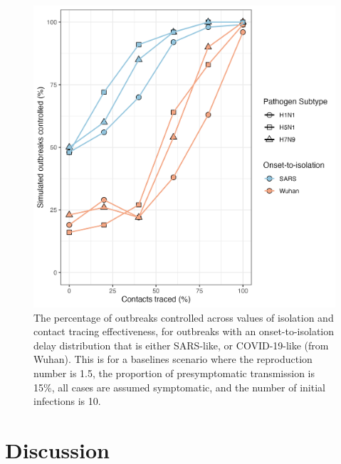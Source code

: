 \documentclass{article}
\begin{document}
\begin{figure}[ht]
\centering
\includegraphics[width=\textwidth]{../plots/prop_outbreak_control_onset_to_isolation.png}
\caption{The percentage of outbreaks controlled across values of isolation and contact tracing effectiveness, for outbreaks with an onset-to-isolation delay distribution that is either SARS-like, or COVID-19-like (from Wuhan). This is for a baselines scenario where the reproduction number is 1.5, the proportion of presymptomatic transmission is 15\%, all cases are assumed symptomatic, and the number of initial infections is 10.}
\label{fig:prop-outbreak-control-onset-to-isolation}
\end{figure}

\section*{Discussion}
\end{document}
